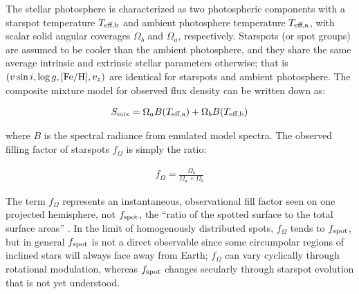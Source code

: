 \documentclass[twocolumn]{emulateapj}%
\begin{document}
The stellar photosphere is characterized as two photospheric components with a starspot temperature $T_\textrm{eff,b}$ and ambient photosphere temperature $T_\textrm{eff,a}$, with scalar solid angular coverages $\Omega_b$ and $\Omega_a$, respectively.    Starspots (or spot groups) are assumed to be cooler than the ambient photosphere, and they share the same average intrinsic and extrinsic stellar parameters otherwise; that is $(v \sin i, \log g, [{\rm Fe}/{\rm H}], v_z)$ are identical for starspots and ambient photosphere.  The composite mixture model for observed flux density can be written down as:

\begin{eqnarray} \label{eqn:mix_M}
S_{\mathrm{mix}} = \Omega_a B(T_\textrm{eff,a})  + \Omega_b B(T_\textrm{eff,b})
\end{eqnarray}

where $B$ is the spectral radiance from emulated model spectra.  The observed filling factor of starspots $f_{\Omega}$ is simply the ratio:

\begin{eqnarray} \label{eqn:fill_factor}
f_{\Omega} = \frac{\Omega_b}{\Omega_a + \Omega_b}
\end{eqnarray}

The term $f_{\Omega}$ represents an instantaneous, observational fill factor seen on one projected hemisphere, not $f_{\rm spot}$, the ``ratio of the spotted surface to the total surface areas'' \citep{somers15}.  In the limit of homogenously distributed spots, $f_{\Omega}$ tends to $f_{\rm spot}$, but in general $f_{\rm spot}$ is not a direct observable since some circumpolar regions of inclined stars will always face away from Earth; $f_{\Omega}$ can vary cyclically through rotational modulation, whereas $f_{\rm spot}$ changes secularly through starspot evolution that is not yet understood.
\end{document}
